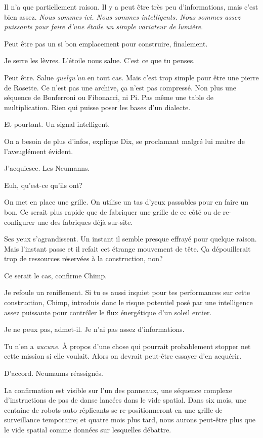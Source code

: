 Il n’a que partiellement raison. Il y a peut être très peu d'informations, mais c’est bien assez. \emph{Nous sommes ici. Nous sommes intelligents. Nous sommes assez puissants pour faire d'une étoile un simple variateur de lumière}.

Peut être pas un si bon emplacement pour construire, finalement.

Je serre les lèvres. \og L'étoile nous salue. C'est ce que tu penses.\fg

\og Peut être. Salue \emph{quelqu'un} en tout cas. Mais c’est trop simple pour être une pierre de Rosette. Ce n'est pas une archive, ça n'est pas compressé. Non plus une séquence de Bonferroni ou Fibonacci, ni Pi. Pas même une table de multiplication. Rien qui puisse poser les bases d'un dialecte.\fg

Et pourtant. Un signal intelligent.

\og On a besoin de plus d'infos\fg , explique Dix, se proclamant malgré lui maitre de l'aveu\-glément évident.

J'acquiesce. \og Les Neumanns.\fg

\og Euh, qu'est-ce qu'ils ont?\fg

\og On met en place une grille. On utilise un tas d'yeux passables pour en faire un bon. Ce serait plus rapide que de fabriquer une grille de ce côté ou de re-configurer une des fabriques déjà sur-site.\fg

Ses yeux s'agrandissent. Un instant il semble presque effrayé pour quel\-que raison. Mais l'instant passe et il refait cet étrange mouvement de tête. \og Ça dépouillerait trop de ressources réservées à la construction, non?\fg

\og Ce serait le cas\fg , confirme Chimp.

Je refoule un reniflement. \og Si tu es aussi inquiet pour tes performances sur cette construction, Chimp, introduis donc le risque potentiel posé par une intelligence assez puissante pour contrôler le flux énergétique d'un soleil entier.\fg

\og Je ne peux pas\fg , admet-il. \og Je n'ai pas assez d'informations.\fg

\og Tu n’en a \emph{aucune}. À propos d'une chose qui pourrait probablement stopper net cette mission si elle voulait. Alors on devrait peut-être essayer d'en acquérir.\fg

\og D'accord. Neumanns réassignés.\fg

La confirmation est visible sur l'un des panneaux, une séquence complexe d’instru\-ctions de pas de danse lancées dans le vide spatial. Dans six mois, une centaine de robots auto-réplicants se re-posi\-tionne\-ront en une grille de surveillance temporaire; et quatre mois plus tard, nous aurons peut-être plus que le vide spatial comme données sur lesquelles débattre.

